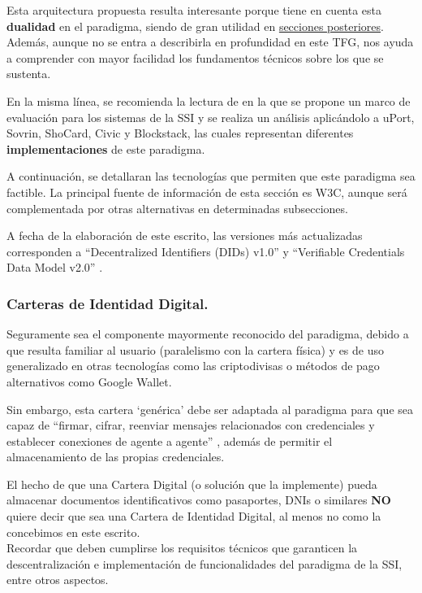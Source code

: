 \documentclass[../main.tex]{subfiles}
\begin{document}
Esta arquitectura propuesta resulta interesante porque tiene en cuenta esta \textbf{dualidad} en el paradigma, siendo de gran utilidad en \hyperref[Riesgos y amenazas]{secciones posteriores}. Además, aunque no se entra a describirla en profundidad en este \acrshort{TFG}, nos ayuda a comprender con mayor facilidad los fundamentos técnicos sobre los que se sustenta. 

En la misma línea, se recomienda la lectura de \cite{EvaluationFramework} en la que se propone un marco de evaluación para los sistemas de la \acrshort{SSI} y se realiza un análisis aplicándolo a uPort, Sovrin, ShoCard, Civic y Blockstack, las cuales representan diferentes \textbf{implementaciones} de este paradigma. 


\newpage
A continuación, se detallaran las tecnologías que permiten que este paradigma sea factible. La principal fuente de información de esta sección es \acrfull{W3C}, aunque será complementada por otras alternativas en determinadas subsecciones.

A fecha de la elaboración de este escrito, las versiones más actualizadas corresponden a ``Decentralized Identifiers (DIDs) v1.0'' \cite{DID-core} y ``Verifiable Credentials Data Model v2.0'' \cite{VC-data-model}.
\\

\subsubsection{Carteras de Identidad Digital.}\label{Carteras de Identidad Digital}
Seguramente sea el componente mayormente reconocido del paradigma, debido a que resulta familiar al usuario (paralelismo con la cartera física) y es de uso generalizado en otras tecnologías como las \Gls{criptodivisas} o métodos de pago alternativos como Google Wallet. 

Sin embargo, esta cartera `genérica' debe ser adaptada al paradigma para que sea capaz de ``firmar, cifrar, reenviar mensajes relacionados con credenciales y establecer conexiones de agente a agente'' \cite{ChallengesSSI}, además de permitir el almacenamiento de las propias credenciales.
\\

\begin{tcolorbox}[colback=gray!10!white, colframe=gray!50!black, title=Observación \theobservacion]\label{observacion-cartera}
El hecho de que una Cartera Digital (o solución que la implemente) pueda almacenar documentos identificativos como pasaportes, DNIs o similares \textbf{NO} quiere decir que sea una Cartera de Identidad Digital, al menos no como la concebimos en este escrito. 
\\ Recordar que deben cumplirse los requisitos técnicos que garanticen la descentralización e implementación de funcionalidades del paradigma de la \acrshort{SSI}, entre otros aspectos. 
\end{tcolorbox}
\newpage
\end{document}
